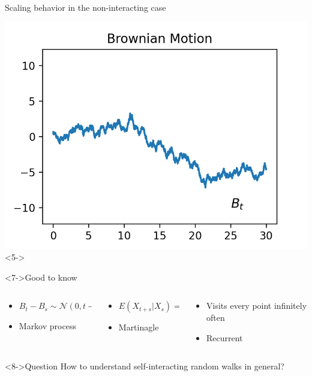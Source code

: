 \documentclass{if-beamer}
\begin{document}
\begin{frame}{Scaling behavior in the non-interacting case}
\begin{minipage}{0.45\textwidth}
            \includegraphics[width=\textwidth]{figures/srw_x5.png}<5->
        \end{minipage}
    \begin{block}<7->{Good to know}
        \begin{columns}
            \begin{column}{0.3\textwidth}
                \begin{itemize}
                    \item 
                    $ B_t - B_s \sim \mathcal{N}(0, t-s)$
                    \item Markov process
                \end{itemize}
            \end{column}
            \begin{column}{0.3\textwidth}
                \begin{itemize}
                    \item $E(X_{t + s} | X_s) = X_s$
                    \item Martinagle
                \end{itemize}
            \end{column}
            \begin{column}{0.3\textwidth}
                \begin{itemize}
                    \item Visits every point infinitely often
                    \item Recurrent
                \end{itemize}
            \end{column}
        \end{columns}
    \end{block}

    \begin{alertblock}<8->{Question}
        How to understand self-interacting random walks in general?
    \end{alertblock}
\end{frame}
\end{document}
